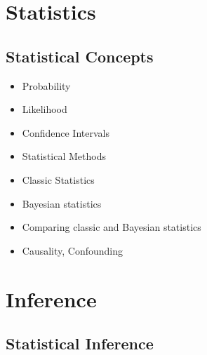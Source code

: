 \documentclass[]{book}
\providecommand{\tightlist}{%
  \setlength{\itemsep}{0pt}\setlength{\parskip}{0pt}}
\begin{document}
\hypertarget{part-statistics}{%
\part{Statistics}\label{part-statistics}}

\hypertarget{statistical-concepts}{%
\chapter{Statistical Concepts}\label{statistical-concepts}}

\begin{itemize}
\tightlist
\item
  Probability
\item
  Likelihood
\item
  Confidence Intervals
\item
  Statistical Methods
\item
  Classic Statistics
\item
  Bayesian statistics
\item
  Comparing classic and Bayesian statistics
\item
  Causality, Confounding
\end{itemize}

\hypertarget{part-inference}{%
\part{Inference}\label{part-inference}}

\hypertarget{statistical-inference}{%
\chapter{Statistical Inference}\label{statistical-inference}}
\end{document}
